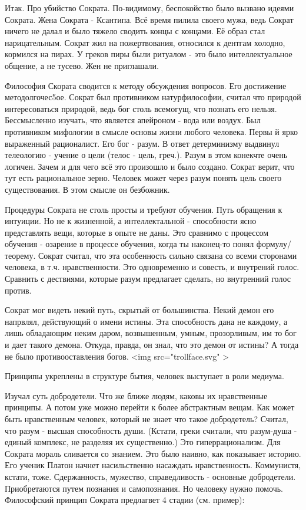Итак. Про убийство Сократа. По-видимому, беспокойство было вызвано идеями Сократа.
Жена Сократа - Ксантипа. Всё время пилила своего мужа, ведь Сократ ничего не далал и было тяжело сводить концы с концами. Её образ стал нарицательным. Сократ жил на пожертвования, относился к дентгам холодно, кормился на пирах. У греков пиры были ритуалом - это было интеллектуальное общение, а не тусево. Жен не приглашали.

Философия Скората сводится к методу обсуждения вопросов. Его достижение методолгочес5ое. Сократ был противником натурфилософии, считал что природой интересоваться природой, ведь бог столь всемогущ, что познать его нельзя. Бессмысленно изучать, что является апейроном - вода или воздух. Был противником мифологии в смысле основы жизни любого человека. Первы й ярко выраженный рационалист. Его бог - разум. В ответ детерминизму выдвинул телеологию - учение о цели (телос - цель, греч.). Разум в этом конекчте очень логичен. Зачем и для чего всё это произошло и было создано. Сократ верит, что тут есть  рациональное зерно. Человек может через разум понять цель своего существования. В этом смысле он безбожник.

Процедуры Сократа не столь просты и требуют обучения. Путь обращения к интуиции. Но не к жизненной, а интеллектальной - способности ясно представлять вещи, которые в опыте не даны. Это сравнимо с процессом обучения - озарение в процессе обучения, когда ты наконец-то понял формулу/теорему. Сократ считал, что эта особенность сильно связана со всеми сторонами человека, в т.ч. нравственности. Это одновременно и совесть, и внутрений голос. Сравнить с дествиями, которые разум предлагает сделать, но внутренний голос против.

Сократ мог видеть некий путь, скрытый от большинства. Некий демон его напрвлял, действующий о  имени истины. Эта способность дана не каждому, а лишь обладающим неким даром, возвышенным, умным, прозорливым, им то бог и дает такого демона. Откуда, правда, он знал, что это демон от истины? А тогда не было противооставления богов. <img src="trollface.svg" >

Принципы укреплены в структуре бытия, человек выступает в роли медиума.

Изучал суть добродетели. Что же ближе людям, каковы их нравственные принципы. А потом уже можно перейти к более абстрактным вещам. Как может быть нравственным человек, который не знает что такое добродетель? Считал, что разум - высшая способность души. (Кстати, греки считали, что разум-душа - единый комплекс, не разделяя их существенно.) Это гиперрационализм. Для Сократа мораль сливается со знанием. Это было наивно, как показывает историю. Его ученик Платон начнет насильственно насаждать нравственность. Коммунистя, кстати, тоже.
Сдержанность, мужество, справедливость - основные добродетели. Приобретаются путем познания и самопознания. Но человеку нужно помочь.
Философский принцип Сократа предлагвет 4 стадии (см. пример):

